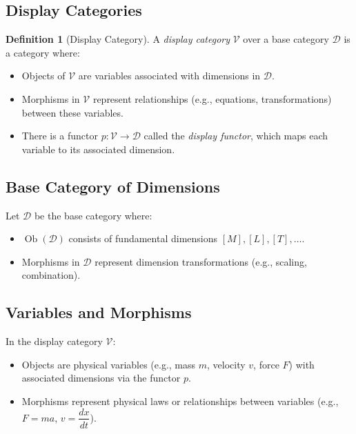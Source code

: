 \documentclass{article}
\theoremstyle{definition}
\newtheorem{definition}{Definition}[section]
\theoremstyle{remark}
\begin{document}
	\subsection{Display Categories}
	
	\begin{definition}[Display Category]
		A \emph{display category} $\mathcal{V}$ over a base category $\mathcal{D}$ is a category where:
		\begin{itemize}
			\item Objects of $\mathcal{V}$ are variables associated with dimensions in $\mathcal{D}$.
			\item Morphisms in $\mathcal{V}$ represent relationships (e.g., equations, transformations) between these variables.
			\item There is a functor $p: \mathcal{V} \rightarrow \mathcal{D}$ called the \emph{display functor}, which maps each variable to its associated dimension.
		\end{itemize}
	\end{definition}
	
	\subsection{Base Category of Dimensions}
	
	Let $\mathcal{D}$ be the base category where:
	\begin{itemize}
		\item $\operatorname{Ob}(\mathcal{D})$ consists of fundamental dimensions $[M], [L], [T], \dots$.
		\item Morphisms in $\mathcal{D}$ represent dimension transformations (e.g., scaling, combination).
	\end{itemize}
	
	\subsection{Variables and Morphisms}
	
	In the display category $\mathcal{V}$:
	\begin{itemize}
		\item Objects are physical variables (e.g., mass $m$, velocity $v$, force $F$) with associated dimensions via the functor $p$.
		\item Morphisms represent physical laws or relationships between variables (e.g., $F = m a$, $v = \dfrac{dx}{dt}$).
	\end{itemize}
	
\end{document}
